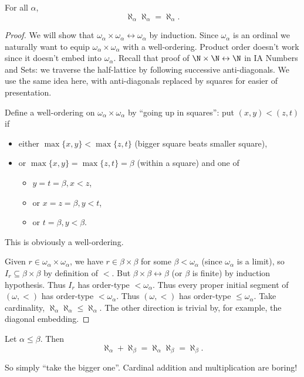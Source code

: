 \documentclass[a4paper]{article}
\newcommand*{\biject}{\leftrightarrow}
\begin{document}
\begin{theorem}
  For all \(\alpha\),
  \[
    \aleph_\alpha \aleph_\alpha = \aleph_\alpha.
  \]
\end{theorem}

\begin{proof}
  We will show that \(\omega_\alpha \times \omega_\alpha \biject \omega_\alpha\) by induction. Since \(\omega_\alpha\) is an ordinal we naturally want to equip \(\omega_\alpha \times \omega_\alpha\) with a well-ordering. Product order doesn't work since it doesn't embed into \(\omega_\alpha\). Recall that proof of \(\N \times \N \biject \N\) in IA Numbers and Sets: we traverse the half-lattice by following successive anti-diagonals. We use the same idea here, with anti-diagonals replaced by squares for easier of presentation.

  Define a well-ordering on \(\omega_\alpha \times \omega_\alpha\) by ``going up in squares'': put \((x, y) < (z, t)\) if
  \begin{itemize}
  \item either \(\max\{x, y\} < \max\{z, t\}\) (bigger square beats smaller square),
  \item or \(\max\{x, y\} = \max\{z, t\} = \beta\) (within a square) and one of
    \begin{itemize}
    \item \(y = t = \beta, x < z\),
    \item  or \(x = z = \beta, y < t\),
    \item or \(t = \beta, y < \beta\).
    \end{itemize}
  \end{itemize}
 This is obviously a well-ordering.

  Given \(r \in \omega_\alpha \times \omega_\alpha\), we have \(r \in \beta \times \beta\) for some \(\beta < \omega_\alpha\) (since \(\omega_\alpha\) is a limit), so \(I_r \subseteq \beta \times \beta\) by definition of \(<\). But \(\beta \times \beta \biject \beta\) (or \(\beta\) is finite) by induction hypothesis. Thus \(I_r\) has order-type \(< \omega_\alpha\). Thus every proper initial segment of \((\omega, <)\) has order-type \(< \omega_\alpha\). Thus \((\omega, <)\) has order-type \(\leq \omega_\alpha\). Take cardinality, \(\aleph_\alpha \aleph_\alpha \leq \aleph_\alpha\). The other direction is trivial by, for example, the diagonal embedding.
\end{proof}

\begin{corollary}
  Let \(\alpha \leq \beta\). Then
  \[
    \aleph_\alpha + \aleph_\beta = \aleph_\alpha \aleph_\beta = \aleph_\beta.
  \]
\end{corollary}
So simply ``take the bigger one''. Cardinal addition and multiplication are boring!
\end{document}
